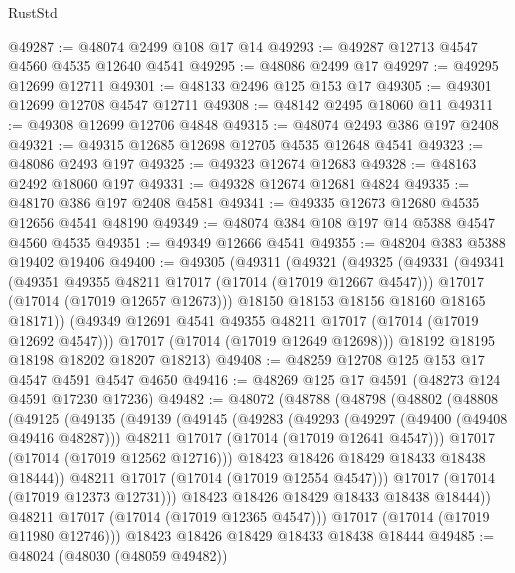 \begin{lexlean}{RustStd}
\begin{coremodule}
@49287 := @48074 @2499 @108 @17 @14
@49293 := @49287 @12713 @4547 @4560 @4535 @12640 @4541
@49295 := @48086 @2499 @17
@49297 := @49295 @12699 @12711
@49301 := @48133 @2496 @125 @153 @17
@49305 := @49301 @12699 @12708 @4547 @12711
@49308 := @48142 @2495 @18060 @11
@49311 := @49308 @12699 @12706 @4848
@49315 := @48074 @2493 @386 @197 @2408
@49321 := @49315 @12685 @12698 @12705 @4535 @12648 @4541
@49323 := @48086 @2493 @197
@49325 := @49323 @12674 @12683
@49328 := @48163 @2492 @18060 @197
@49331 := @49328 @12674 @12681 @4824
@49335 := @48170 @386 @197 @2408 @4581
@49341 := @49335 @12673 @12680 @4535 @12656 @4541 @48190
@49349 := @48074 @384 @108 @197 @14 @5388 @4547 @4560 @4535
@49351 := @49349 @12666 @4541
@49355 := @48204 @383 @5388 @19402 @19406
@49400 := @49305
    (@49311
      (@49321
        (@49325
          (@49331
            (@49341
              (@49351 @49355 @48211 @17017 (@17014 (@17019 @12667 @4547)))
              @17017
              (@17014 (@17019 @12657 @12673)))
            @18150
            @18153
            @18156
            @18160
            @18165
            @18171))
        (@49349 @12691 @4541 @49355 @48211 @17017 (@17014 (@17019 @12692 @4547)))
        @17017
        (@17014 (@17019 @12649 @12698)))
      @18192
      @18195
      @18198
      @18202
      @18207
      @18213)
@49408 := @48259 @12708 @125 @153 @17 @4547 @4591 @4547 @4650
@49416 := @48269 @125 @17 @4591 (@48273 @124 @4591 @17230 @17236)
@49482 := @48072
    (@48788
      (@48798
        (@48802
          (@48808
            (@49125
              (@49135
                (@49139
                  (@49145
                    (@49283
                      (@49293
                        (@49297 (@49400 (@49408 @49416 @48287)))
                        @48211
                        @17017
                        (@17014 (@17019 @12641 @4547)))
                      @17017
                      (@17014 (@17019 @12562 @12716)))
                    @18423
                    @18426
                    @18429
                    @18433
                    @18438
                    @18444))
                @48211
                @17017
                (@17014 (@17019 @12554 @4547)))
              @17017
              (@17014 (@17019 @12373 @12731)))
            @18423
            @18426
            @18429
            @18433
            @18438
            @18444))
        @48211
        @17017
        (@17014 (@17019 @12365 @4547)))
      @17017
      (@17014 (@17019 @11980 @12746)))
    @18423
    @18426
    @18429
    @18433
    @18438
    @18444
@49485 := @48024 (@48030 (@48059 @49482))

\end{coremodule}
\end{lexlean}
